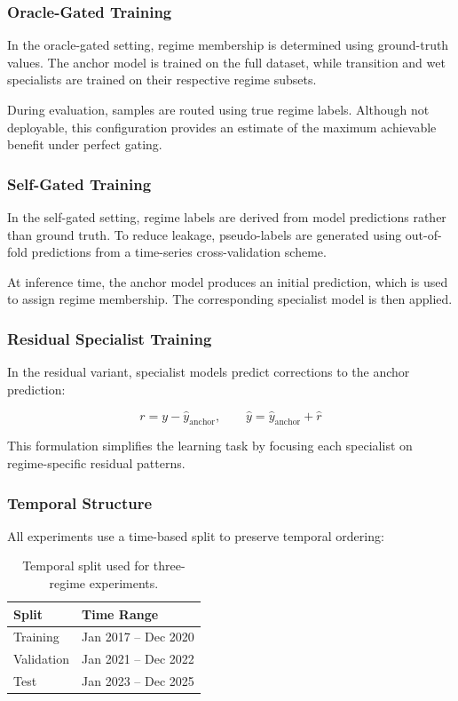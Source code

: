 \subsubsection*{Oracle-Gated Training}

In the oracle-gated setting, regime membership is determined using ground-truth values. The anchor model is trained on the full dataset, while transition and wet specialists are trained on their respective regime subsets.

During evaluation, samples are routed using true regime labels. Although not deployable, this configuration provides an estimate of the maximum achievable benefit under perfect gating.

\subsubsection*{Self-Gated Training}

In the self-gated setting, regime labels are derived from model predictions rather than ground truth. To reduce leakage, pseudo-labels are generated using out-of-fold predictions from a time-series cross-validation scheme.

At inference time, the anchor model produces an initial prediction, which is used to assign regime membership. The corresponding specialist model is then applied.

\subsubsection*{Residual Specialist Training}

In the residual variant, specialist models predict corrections to the anchor prediction:

\begin{equation}
r = y - \hat{y}_{\text{anchor}}, \qquad
\hat{y} = \hat{y}_{\text{anchor}} + \hat{r}
\end{equation}

This formulation simplifies the learning task by focusing each specialist on regime-specific residual patterns.

\subsubsection*{Temporal Structure}

All experiments use a time-based split to preserve temporal ordering:

\begin{table}[H]
\centering
\begin{tabular}{ll}
\toprule
\textbf{Split} & \textbf{Time Range} \\
\midrule
Training & Jan 2017 -- Dec 2020 \\
Validation & Jan 2021 -- Dec 2022 \\
Test & Jan 2023 -- Dec 2025 \\
\bottomrule
\end{tabular}
\caption{Temporal split used for three-regime experiments.}
\end{table}

